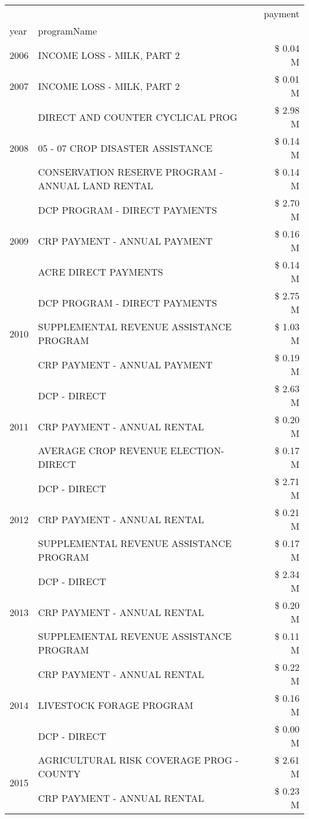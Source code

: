 \begin{tabular}{llr}
\toprule
 &  & payment \\
year & programName &  \\
\midrule
2006 & INCOME LOSS - MILK, PART 2 & \$ 0.04 M \\
\cline{1-3}
2007 & INCOME LOSS - MILK, PART 2 & \$ 0.01 M \\
\cline{1-3}
\multirow[t]{3}{*}{2008} & DIRECT AND COUNTER CYCLICAL PROG & \$ 2.98 M \\
 & 05 - 07 CROP DISASTER ASSISTANCE & \$ 0.14 M \\
 & CONSERVATION RESERVE PROGRAM - ANNUAL LAND RENTAL & \$ 0.14 M \\
\cline{1-3}
\multirow[t]{3}{*}{2009} & DCP PROGRAM - DIRECT PAYMENTS & \$ 2.70 M \\
 & CRP PAYMENT - ANNUAL PAYMENT & \$ 0.16 M \\
 & ACRE DIRECT PAYMENTS & \$ 0.14 M \\
\cline{1-3}
\multirow[t]{3}{*}{2010} & DCP PROGRAM - DIRECT PAYMENTS & \$ 2.75 M \\
 & SUPPLEMENTAL REVENUE ASSISTANCE PROGRAM & \$ 1.03 M \\
 & CRP PAYMENT - ANNUAL PAYMENT & \$ 0.19 M \\
\cline{1-3}
\multirow[t]{3}{*}{2011} & DCP - DIRECT & \$ 2.63 M \\
 & CRP PAYMENT - ANNUAL RENTAL & \$ 0.20 M \\
 & AVERAGE CROP REVENUE ELECTION-DIRECT & \$ 0.17 M \\
\cline{1-3}
\multirow[t]{3}{*}{2012} & DCP - DIRECT & \$ 2.71 M \\
 & CRP PAYMENT - ANNUAL RENTAL & \$ 0.21 M \\
 & SUPPLEMENTAL REVENUE ASSISTANCE PROGRAM & \$ 0.17 M \\
\cline{1-3}
\multirow[t]{3}{*}{2013} & DCP - DIRECT & \$ 2.34 M \\
 & CRP PAYMENT - ANNUAL RENTAL & \$ 0.20 M \\
 & SUPPLEMENTAL REVENUE ASSISTANCE PROGRAM & \$ 0.11 M \\
\cline{1-3}
\multirow[t]{3}{*}{2014} & CRP PAYMENT - ANNUAL RENTAL & \$ 0.22 M \\
 & LIVESTOCK FORAGE PROGRAM & \$ 0.16 M \\
 & DCP - DIRECT & \$ 0.00 M \\
\cline{1-3}
\multirow[t]{3}{*}{2015} & AGRICULTURAL RISK COVERAGE PROG - COUNTY & \$ 2.61 M \\
 & CRP PAYMENT - ANNUAL RENTAL & \$ 0.23 M \\

\end{tabular}
